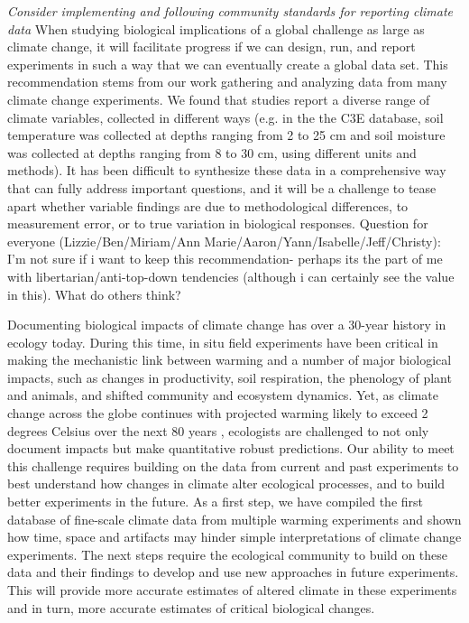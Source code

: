 \documentclass{article}
\begin{document}
\par\textit{Consider implementing and following community standards for reporting climate data} 
When studying biological implications of a global challenge as large as climate change, it will facilitate progress if we can design, run, and report experiments in such a way that we can eventually create a global data set. This recommendation stems from our work gathering and analyzing data from many climate change experiments. We found that studies report a diverse range of climate variables, collected in different ways (e.g. in the the C3E database, soil temperature was collected at depths ranging from 2 to 25 cm and soil moisture was collected at depths ranging from 8 to 30 cm, using different units and methods). It has been difficult to synthesize these data in a comprehensive way that can fully address important questions, and it will be a challenge to tease apart whether variable findings are due to methodological differences, to measurement error, or to true variation in biological responses. Question for everyone (Lizzie/Ben/Miriam/Ann Marie/Aaron/Yann/Isabelle/Jeff/Christy): I'm not sure if i want to keep this recommendation- perhaps its the part of me with libertarian/anti-top-down tendencies (although i can certainly see the value in this). What do others think? %
\par Documenting biological impacts of climate change has over a 30-year history in ecology today. During this time, in situ field experiments have been critical in making the mechanistic link between warming and a number of major biological impacts, such as changes in productivity, soil respiration, the phenology of plant and animals, and shifted community and ecosystem dynamics. Yet, as climate change across the globe continues with projected warming likely to exceed 2 degrees Celsius over the next 80 years \citep{ipcc2013}, ecologists are challenged to not only document impacts but make quantitative robust predictions. Our ability to meet this challenge requires building on the data from current and past experiments to best understand how changes in climate alter ecological processes, and to build better experiments in the future. As a first step, we have compiled the first database of fine-scale climate data from multiple warming experiments and shown how time, space and artifacts may hinder simple interpretations of climate change experiments. The next steps require the ecological community to build on these data and their findings to develop and use new approaches in future experiments. This will provide more accurate estimates of altered climate in these experiments and in turn, more accurate estimates of critical biological changes. 

\clearpage
\end{document}
